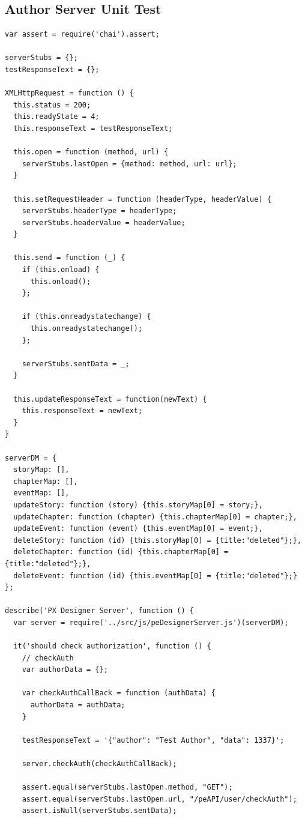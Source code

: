 \documentclass[12pt]{ucthesis}
\begin{document}
\subsection{Author Server Unit Test}
\begin{lstlisting}
var assert = require('chai').assert;

serverStubs = {};
testResponseText = {};

XMLHttpRequest = function () {
  this.status = 200;
  this.readyState = 4;
  this.responseText = testResponseText;
  
  this.open = function (method, url) {
    serverStubs.lastOpen = {method: method, url: url};
  }

  this.setRequestHeader = function (headerType, headerValue) {
    serverStubs.headerType = headerType;
    serverStubs.headerValue = headerValue;
  }

  this.send = function (_) {
    if (this.onload) {
      this.onload();
    };

    if (this.onreadystatechange) {
      this.onreadystatechange();
    };

    serverStubs.sentData = _;
  }

  this.updateResponseText = function(newText) {
    this.responseText = newText;
  }
}

serverDM = {
  storyMap: [],
  chapterMap: [],
  eventMap: [],
  updateStory: function (story) {this.storyMap[0] = story;},
  updateChapter: function (chapter) {this.chapterMap[0] = chapter;},
  updateEvent: function (event) {this.eventMap[0] = event;},
  deleteStory: function (id) {this.storyMap[0] = {title:"deleted"};},
  deleteChapter: function (id) {this.chapterMap[0] = {title:"deleted"};},
  deleteEvent: function (id) {this.eventMap[0] = {title:"deleted"};}
};

describe('PX Designer Server', function () {
  var server = require('../src/js/peDesignerServer.js')(serverDM);

  it('should check authorization', function () {
    // checkAuth
    var authorData = {};

    var checkAuthCallBack = function (authData) {
      authorData = authData;
    }

    testResponseText = '{"author": "Test Author", "data": 1337}';

    server.checkAuth(checkAuthCallBack);

    assert.equal(serverStubs.lastOpen.method, "GET");
    assert.equal(serverStubs.lastOpen.url, "/peAPI/user/checkAuth");
    assert.isNull(serverStubs.sentData);


\end{lstlisting}
\end{document}
